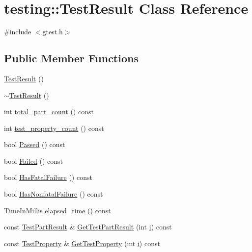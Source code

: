 \hypertarget{classtesting_1_1TestResult}{}\section{testing\+:\+:Test\+Result Class Reference}
\label{classtesting_1_1TestResult}


{\ttfamily \#include $<$gtest.\+h$>$}

\subsection*{Public Member Functions}
\begin{DoxyCompactItemize}
\item 
\hyperlink{classtesting_1_1TestResult_a5cf5dd6f416b7334ea601aab21a2fda5}{Test\+Result} ()
\item 
\hyperlink{classtesting_1_1TestResult_a41f407680b725b75d7eadc3230bc3315}{$\sim$\+Test\+Result} ()
\item 
int \hyperlink{classtesting_1_1TestResult_ae6a378ec743edfbed55890c955d0adc8}{total\+\_\+part\+\_\+count} () const 
\item 
int \hyperlink{classtesting_1_1TestResult_a5075f9d595d51c7cc2f5c0921e622831}{test\+\_\+property\+\_\+count} () const 
\item 
bool \hyperlink{classtesting_1_1TestResult_aa46a04342f02ec297357f47288da3ef3}{Passed} () const 
\item 
bool \hyperlink{classtesting_1_1TestResult_abb5d051bf958071c14020132a4d6cc07}{Failed} () const 
\item 
bool \hyperlink{classtesting_1_1TestResult_ace61ce992083a9124f9ff0e99a2041cc}{Has\+Fatal\+Failure} () const 
\item 
bool \hyperlink{classtesting_1_1TestResult_a34e6901b9772f51ce4f17a5517c26607}{Has\+Nonfatal\+Failure} () const 
\item 
\hyperlink{namespacetesting_a992de1d091ce660f451d1e8b3ce30fd6}{Time\+In\+Millis} \hyperlink{classtesting_1_1TestResult_a582f6383265d0619df812b75499d0616}{elapsed\+\_\+time} () const 
\item 
const \hyperlink{classtesting_1_1TestPartResult}{Test\+Part\+Result} \& \hyperlink{classtesting_1_1TestResult_a08b680f63d91391db4161f909da2bbcc}{Get\+Test\+Part\+Result} (int \hyperlink{gtest__output__test__golden__lin_8txt_a7e98b8a17c0aad30ba64d47b74e2a6c1}{i}) const 
\item 
const \hyperlink{classtesting_1_1TestProperty}{Test\+Property} \& \hyperlink{classtesting_1_1TestResult_a2cb23a457a444ba85684dd655895f08e}{Get\+Test\+Property} (int \hyperlink{gtest__output__test__golden__lin_8txt_a7e98b8a17c0aad30ba64d47b74e2a6c1}{i}) const 
\end{DoxyCompactItemize}
